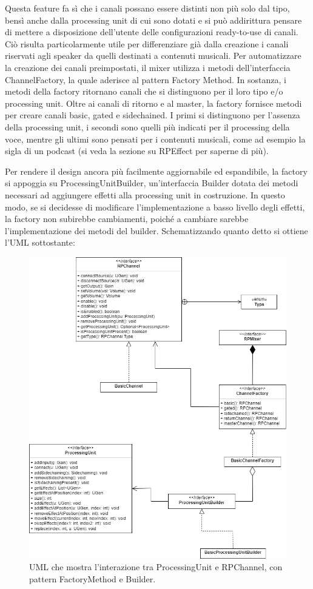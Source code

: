 \documentclass[a4paper,12pt]{report}
\begin{document}
Questa feature fa sì che i canali possano essere distinti non più solo dal tipo, bensì anche dalla processing unit di cui sono dotati e si può addirittura pensare di mettere a disposizione dell’utente delle configurazioni ready-to-use di canali. Ciò risulta particolarmente utile per differenziare già dalla creazione i canali riservati agli speaker da quelli destinati a contenuti musicali.
Per automatizzare la creazione dei canali preimpostati, il mixer utilizza i metodi dell’interfaccia ChannelFactory, la quale aderisce al pattern Factory Method. In sostanza, i metodi della factory ritornano canali che si distinguono per il loro tipo e/o processing unit. Oltre ai canali di ritorno e al master, la factory fornisce metodi per creare canali basic, gated e sidechained. I primi si distinguono per l’assenza della processing unit, i secondi sono quelli più indicati per il processing della voce, mentre gli ultimi sono pensati per i contenuti musicali, come ad esempio la sigla di un podcast (si veda la sezione su RPEffect per saperne di più).

Per rendere il design ancora più facilmente aggiornabile ed espandibile, la factory si appoggia su ProcessingUnitBuilder, un’interfaccia Builder dotata dei metodi necessari ad aggiungere effetti alla processing unit in costruzione. In questo modo, se si decidesse di modificare l’implementazione a basso livello degli effetti, la factory non subirebbe cambiamenti, poiché a cambiare sarebbe l’implementazione dei metodi del builder.
Schematizzando quanto detto si ottiene l’UML sottostante:
\endsubsubsection

\begin{figure}[H]
\centering{}
\includegraphics[width=\textwidth]{img/processingUnit.png}
\caption{UML che mostra l'interazione tra ProcessingUnit e RPChannel, con pattern FactoryMethod e Builder.}
\end{figure}
\end{document}
